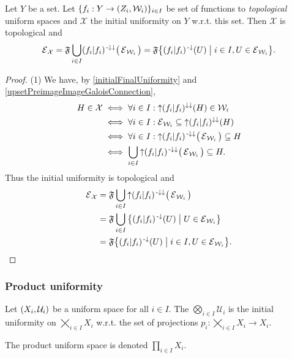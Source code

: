 \begin{proposition} \label{topologicalInitialUniformity}
Let $Y$ be a set. Let $\{f_i: Y\to \sSet{Z_i, \mathcal{W}_i}\}_{i\in I}$ be set of functions to \emph{topological} uniform spaces and $\mathcal{X}$ the initial uniformity on $Y$ w.r.t. this set. Then $\mathcal{X}$ is topological and
\[ \entourage_\mathcal{X} = \mathfrak{F}\bigcup_{i\in I} (f_i|f_i)^{\preimf\imf}\big(\entourage_{\mathcal{W}_i}\big) = \mathfrak{F}\setbuilder{(f_i|f_i)^\preimf(U)}{i\in I, U\in \entourage_{\mathcal{W}_i}}. \]
\end{proposition}
\begin{proof}
(1) We have, by \ref{initialFinalUniformity} and \ref{upsetPreimageImageGaloisConnection},
\begin{align*}
H \in \mathcal{X} &\iff \forall i\in I: \operatorname{\uparrow}(f_i|f_i)^{\downarrow\downarrow}(H) \in \mathcal{W}_i \\
&\iff \forall i\in I: \operatorname{\mathcal{E}}_{\mathcal{W}_i} \subseteq \operatorname{\uparrow}(f_i|f_i)^{\downarrow\downarrow}(H) \\
&\iff \forall i\in I: \operatorname{\uparrow} (f_i|f_i)^{{\text{\hspace{0.15em}-}\downarrow}\downarrow}\big(\operatorname{\mathcal{E}}_{\mathcal{W}_i}\big) \subseteq H \\
&\iff \bigcup_{i\in I} \operatorname{\uparrow} (f_i|f_i)^{{\text{\hspace{0.15em}-}\downarrow}\downarrow}\big(\operatorname{\mathcal{E}}_{\mathcal{W}_i}\big) \subseteq H.
\end{align*}
Thus the initial uniformity is topological and
\begin{align*}
\entourage_\mathcal{X} &= \mathfrak{F}\bigcup_{i\in I} \upset (f_i|f_i)^{\preimf\imf}\big(\entourage_{\mathcal{W}_i}\big) \\
&= \mathfrak{F}\bigcup_{i\in I}\setbuilder{(f_i|f_i)^\preimf(U)}{U\in \entourage_{\mathcal{W}_i}} \\
&= \mathfrak{F}\setbuilder{(f_i|f_i)^\preimf(U)}{i\in I, U\in \entourage_{\mathcal{W}_i}}.
\end{align*}
\end{proof}

\subsubsection{Product uniformity}
\begin{definition}
Let $\sSet{X_i, \mathcal{U}_i}$ be a uniform space for all $i\in I$. The  $\bigotimes_{i\in I}\mathcal{U}_i$ is the initial uniformity on $\bigtimes_{i\in I}X_i$ w.r.t. the set of projections $p_i: \bigtimes_{i\in I}X_i \to X_i$.

The product uniform space is denoted $\prod_{i\in I}X_i$.
\end{definition}

